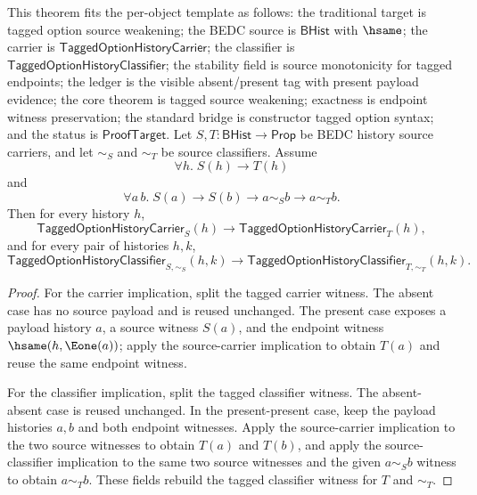 \begin{theorem}
\label{thm:tagged-option-source-weakening}
This theorem fits the per-object template as follows: the traditional target is
tagged option source weakening; the BEDC source is $\mathsf{BHist}$ with
$\hsame$; the carrier is $\mathsf{TaggedOptionHistoryCarrier}$; the classifier
is $\mathsf{TaggedOptionHistoryClassifier}$; the stability field is source
monotonicity for tagged endpoints; the ledger is the visible absent/present tag
with present payload evidence; the core theorem is tagged source weakening;
exactness is endpoint witness preservation; the standard bridge is constructor
tagged option syntax; and the status is $\mathsf{ProofTarget}$. Let
$S,T:\mathsf{BHist}\to\mathsf{Prop}$ be BEDC history source carriers, and let
$\sim_S$ and $\sim_T$ be source classifiers. Assume
$$
\forall h.\; S(h)\to T(h)
$$
and
$$
\forall a\,b.\; S(a)\to S(b)\to a\sim_S b\to a\sim_T b.
$$
Then for every history $h$,
$$
\mathsf{TaggedOptionHistoryCarrier}_S(h)\to
\mathsf{TaggedOptionHistoryCarrier}_T(h),
$$
and for every pair of histories $h,k$,
$$
\mathsf{TaggedOptionHistoryClassifier}_{S,\sim_S}(h,k)\to
\mathsf{TaggedOptionHistoryClassifier}_{T,\sim_T}(h,k).
$$
\end{theorem}
\begin{proof}
For the carrier implication, split the tagged carrier witness. The absent case
has no source payload and is reused unchanged. The present case exposes a
payload history $a$, a source witness $S(a)$, and the endpoint witness
$\hsame(h,\Eone(a))$; apply the source-carrier implication to obtain $T(a)$ and
reuse the same endpoint witness.

For the classifier implication, split the tagged classifier witness. The
absent-absent case is reused unchanged. In the present-present case, keep the
payload histories $a,b$ and both endpoint witnesses. Apply the source-carrier
implication to the two source witnesses to obtain $T(a)$ and $T(b)$, and apply
the source-classifier implication to the same two source witnesses and the
given $a\sim_S b$ witness to obtain $a\sim_T b$. These fields rebuild the
tagged classifier witness for $T$ and $\sim_T$.
\end{proof}

